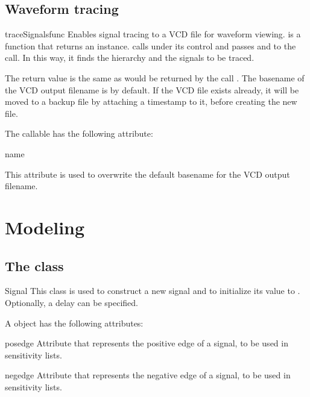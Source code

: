 \subsection{Waveform tracing\label{ref-trace}}


\begin{funcdesc}{traceSignals}{func  }
Enables signal tracing to a VCD file for waveform viewing.
 is a function that returns an instance.
 calls  under its control
and passes  and  to the call. In this way, it
finds the hierarchy and the signals to be traced.

The return value is the same as would be returned by the call
.
The basename of the VCD output filename is 
by default.
If the VCD file exists already, it will be moved to a backup file by
attaching a timestamp to it, before creating the new file.
\end{funcdesc}

The  callable has the following attribute:

\begin{memberdesc}[traceSignals]{name}

This attribute is used to overwrite the default basename for the
VCD output filename.
\end{memberdesc}

\section{Modeling \label{ref-model}}

\subsection{The  class \label{ref-sig}}

\begin{classdesc}{Signal}{ }
This class is used to construct a new signal and to initialize its
value to . Optionally, a delay can be specified.
\end{classdesc}

A  object has the following attributes:

\begin{memberdesc}[Signal]{posedge}
Attribute that represents the positive edge of a signal, to be
used in sensitivity lists.
\end{memberdesc}
\begin{memberdesc}[Signal]{negedge}
Attribute that represents the negative edge of a signal, to be
used in sensitivity lists.
\end{memberdesc}


